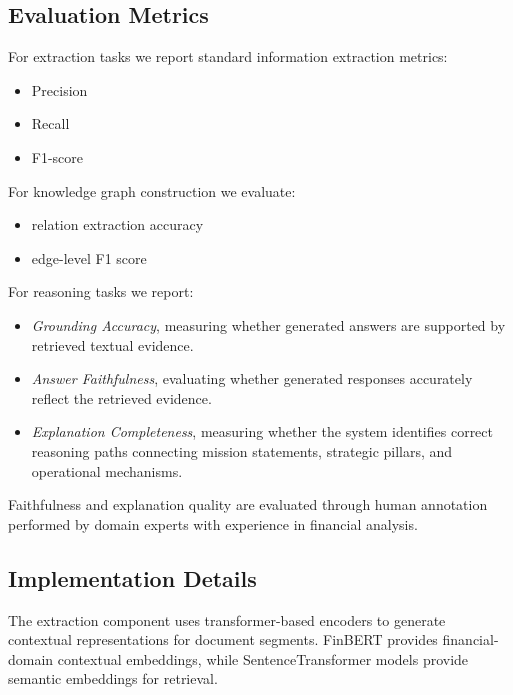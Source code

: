\documentclass[11pt]{article}
\begin{document}
\subsection{Evaluation Metrics}

For extraction tasks we report standard information extraction metrics:

\begin{itemize}[leftmargin=1.0em, itemsep=0.05em, topsep=0.05em]
\item Precision
\item Recall
\item F1-score
\end{itemize}

For knowledge graph construction we evaluate:

\begin{itemize}[leftmargin=1.0em, itemsep=0.05em, topsep=0.05em]
\item relation extraction accuracy
\item edge-level F1 score
\end{itemize}

For reasoning tasks we report:

\begin{itemize}[leftmargin=1.0em, itemsep=0.05em, topsep=0.05em]

\item \textit{Grounding Accuracy}, measuring whether generated answers are supported by retrieved textual evidence.

\item \textit{Answer Faithfulness}, evaluating whether generated responses accurately reflect the retrieved evidence.

\item \textit{Explanation Completeness}, measuring whether the system identifies correct reasoning paths connecting mission statements, strategic pillars, and operational mechanisms.

\end{itemize}

Faithfulness and explanation quality are evaluated through human annotation performed by domain experts with experience in financial analysis.

\subsection{Implementation Details}

The extraction component uses transformer-based encoders to generate contextual representations for document segments. FinBERT provides financial-domain contextual embeddings, while SentenceTransformer models provide semantic embeddings for retrieval.
\end{document}
